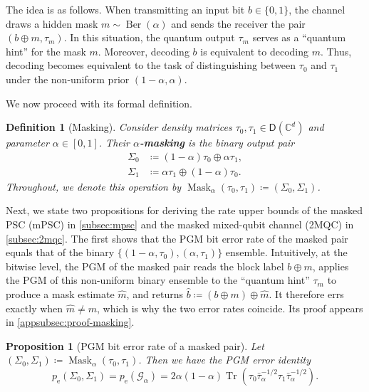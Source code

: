 \documentclass[11pt]{article}
\newtheorem{prop}[prop]{Proposition}
\newtheorem{definition}{Definition}[section]
\theoremstyle{remark}
\newcommand{\cG}{\mathcal{G}}
\newcommand{\C}{\mathbb{C}}
\newcommand{\Ber}{\operatorname{Ber}}
\newcommand{\Tr}{\operatorname{Tr}}
\newcommand{\Dens}{\mathsf{D}}
\newcommand{\bits}{\{0,1\}}
\begin{document}
The idea is as follows. When transmitting an input bit $b \in \bits$, the channel draws a hidden mask $m \sim \Ber(\alpha)$ and sends the receiver the pair $(b \oplus m, \tau_m)$. In this situation, the quantum output $\tau_m$ serves as a ``quantum hint'' for the mask $m$. Moreover, decoding $b$ is equivalent to decoding $m$. Thus, decoding becomes equivalent to the task of distinguishing between $\tau_0$ and $\tau_1$ under the non-uniform prior $(1-\alpha,\alpha)$.

We now proceed with its formal definition.

\begin{definition}[Masking]
\label{def:masking}
Consider density matrices $\tau_0,\tau_1 \in \Dens(\C^d)$ and parameter $\alpha \in [0,1]$. Their \textbf{$\alpha$-masking} is the binary output pair
\begin{align*}
\Sigma_0 &\coloneqq (1-\alpha)\tau_0 \oplus \alpha\tau_1, \\
\Sigma_1 &\coloneqq \alpha\tau_1 \oplus (1-\alpha)\tau_0.
\end{align*}
Throughout, we denote this operation by $\operatorname{Mask}_\alpha(\tau_0,\tau_1) \coloneqq (\Sigma_0,\Sigma_1)$.
\end{definition}

Next, we state two propositions for deriving the rate upper bounds of the masked PSC (mPSC) in \cref{subsec:mpsc} and the masked mixed-qubit channel (2MQC) in \cref{subsec:2mqc}. The first shows that the PGM bit error rate of the masked pair equals that of the binary $\{(1-\alpha,\tau_0),(\alpha,\tau_1)\}$ ensemble. Intuitively, at the bitwise level, the PGM of the masked pair reads the block label $b \oplus m$, applies the PGM of this non-uniform binary ensemble to the ``quantum hint'' $\tau_m$ to produce a mask estimate $\widehat{m}$, and returns $\widehat{b} \coloneqq (b \oplus m) \oplus \widehat{m}$. It therefore errs exactly when $\widehat{m} \neq m$, which is why the two error rates coincide. Its proof appears in \cref{appsubsec:proof-masking}.

\begin{prop}[PGM bit error rate of a masked pair]
\label{prop:masking-pgm-error}
Let $(\Sigma_0,\Sigma_1) \coloneqq \operatorname{Mask}_\alpha(\tau_0,\tau_1)$. Then we have the PGM error identity
\begin{equation}
\label{eq:masking-pgm-error}
p_{\mathrm{e}}(\Sigma_0,\Sigma_1)
= p_{\mathrm{e}}\left(\cG_\alpha\right) = 2\alpha(1-\alpha)\Tr\left(\tau_0\bar{\tau}_\alpha^{-1/2}\tau_1\bar{\tau}_\alpha^{-1/2}\right).
\end{equation}
\end{prop}
\end{document}

